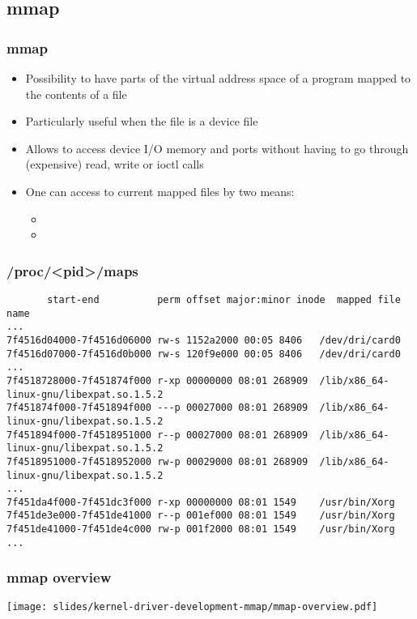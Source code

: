 \subsection{mmap}

\begin{frame}
  \frametitle{mmap}
  \begin{itemize}
  \item Possibility to have parts of the virtual address space of a
    program mapped to the contents of a file
  \item Particularly useful when the file is a device file
  \item Allows to access device I/O memory and ports without having to
    go through (expensive) read, write or ioctl calls
  \item One can access to current mapped files by two means:
    \begin{itemize}
    \item {}
    \item {}
    \end{itemize}
  \end{itemize}
\end{frame}

\begin{frame}[fragile]
  \frametitle{/proc/\textless pid\textgreater/maps}
{\footnotesize
\begin{verbatim}
       start-end          perm offset major:minor inode  mapped file name
...
7f4516d04000-7f4516d06000 rw-s 1152a2000 00:05 8406   /dev/dri/card0
7f4516d07000-7f4516d0b000 rw-s 120f9e000 00:05 8406   /dev/dri/card0
...
7f4518728000-7f451874f000 r-xp 00000000 08:01 268909  /lib/x86_64-linux-gnu/libexpat.so.1.5.2
7f451874f000-7f451894f000 ---p 00027000 08:01 268909  /lib/x86_64-linux-gnu/libexpat.so.1.5.2
7f451894f000-7f4518951000 r--p 00027000 08:01 268909  /lib/x86_64-linux-gnu/libexpat.so.1.5.2
7f4518951000-7f4518952000 rw-p 00029000 08:01 268909  /lib/x86_64-linux-gnu/libexpat.so.1.5.2
...
7f451da4f000-7f451dc3f000 r-xp 00000000 08:01 1549    /usr/bin/Xorg
7f451de3e000-7f451de41000 r--p 001ef000 08:01 1549    /usr/bin/Xorg
7f451de41000-7f451de4c000 rw-p 001f2000 08:01 1549    /usr/bin/Xorg
...
\end{verbatim}
}
\end{frame}

\begin{frame}
  \frametitle{mmap overview}
  \begin{center}
    \texttt{[image: slides/kernel-driver-development-mmap/mmap-overview.pdf]}
  \end{center}
\end{frame}

